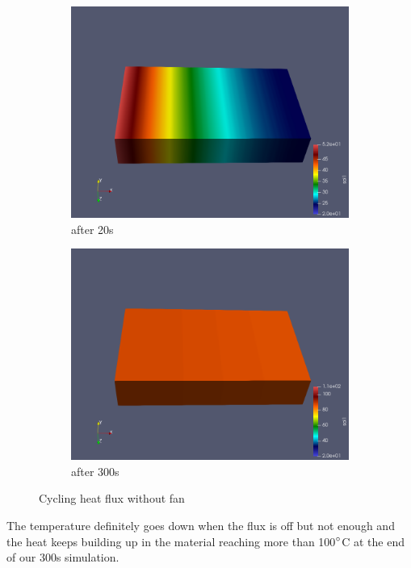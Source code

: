 \documentclass{article}
\begin{document}
\begin{figure}[H]
\begin{subfigure}{.5\textwidth}
  \centering
  \includegraphics[width=1\linewidth]{images/noFan40s.png}
  \caption{after 20s}
  \label{fig:sfig1}
\end{subfigure}
\begin{subfigure}{.5\textwidth}
  \centering
  \includegraphics[width=1\linewidth]{images/noFan300s.png}
  \caption{after 300s}
\end{subfigure}
\caption{Cycling heat flux without fan}
\label{fig:fig}
\end{figure}

The temperature definitely goes down when the flux is off but not enough and the heat keeps building up in the material reaching more than 100$\degree$C at the end of our 300s simulation. 
\end{document}
